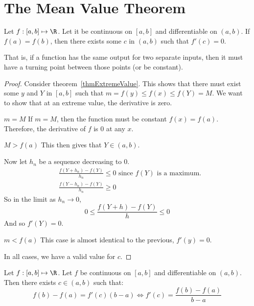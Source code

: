 \documentclass[../Main.tex]{subfiles}
\begin{document}
\section{The Mean Value Theorem}
\begin{theorem}
    Let $f : [a, b] \mapsto \R$. Let it be continuous on $[a, b]$ and differentiable on $(a, b)$. If $f(a) = f(b)$, then there exists some $c$ in $(a, b)$ such that $f'(c) = 0$.
\end{theorem}
That is, if a function has the same output for two separate inputs, then it must have a turning point between those points (or be constant).
\begin{proof}
    Consider theorem~\ref{thmExtremeValue}. This shows that there must exist some $y$ and $Y$ in $[a, b]$ such that $m = f(y) \leq f(x) \leq f(Y) = M$. We want to show that at an extreme value, the derivative is zero.
    \begin{case}{$m = M$}
        If $m = M$, then the function must be constant $f(x) = f(a)$. Therefore, the derivative of $f$ is 0 at any $x$.
    \end{case}
    \begin{case}{$M > f(a)$}
        This then gives that $Y \in (a, b)$.\par
        Now let $h_n$ be a sequence decreasing to $0$.
        \begin{align*}
            &\frac{f(Y + h_n) - f(Y)}{h_n} \leq 0 \text{ since } f(Y) \text{ is a maximum.} \\
            &\frac{f(Y - h_n) - f(Y)}{h_n} \geq 0
        \end{align*}
        So in the limit as $h_n \to 0$,
        \begin{equation*}
            0 \leq \frac{f(Y + h) - f(Y)}{h} \leq 0
        \end{equation*}
        And so $f'(Y) = 0$.
    \end{case}
    \begin{case}{$m < f(a)$}
        This case is almost identical to the previous, $f'(y) = 0$.
    \end{case}
    In all cases, we have a valid value for $c$.
\end{proof}
\begin{theorem}
    Let $f : [a, b] \mapsto \R$. Let $f$ be continuous on $[a, b]$ and differentiable on $(a, b)$. Then there exists $c \in (a, b)$ such that:
    \begin{equation*}
        f(b) - f(a) = f'(c)(b - a) \Leftrightarrow f'(c) = \frac{f(b) - f(a)}{b - a}
    \end{equation*}
    \label{thmMeanValue}
\end{theorem}
\end{document}
